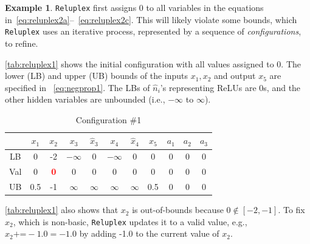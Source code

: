 \documentclass[oneside,11pt,dvipsnames]{book}
\numberwithin{equation}{section}
\theoremstyle{definition}
\newtheorem{example}{Example}[section]
\theoremstyle{remark}
\newcommand{\red}[1]{\textcolor{red}{#1}}
\newcommand{\reluplex}{\texttt{Reluplex}}
\newcommand{\sat}{\texttt{sat}}
\newcommand{\unsat}{\texttt{unsat}}
\begin{document}
\begin{example}
\reluplex{} first assigns 0 to all variables in the equations in~\autoref{eq:reluplex2a}--~\autoref{eq:reluplex2c}.  This will likely violate some bounds, which \reluplex{} uses an iterative process, represented by a sequence of \emph{configurations}, to refine.



\autoref{tab:reluplex1} shows the initial configuration with all values assigned to 0.
The lower (LB) and upper (UB) bounds of the inputs $x_1, x_2$ and output $x_5$ are specified in ~\autoref{eq:negprop1}. The LBs of $\hat{n}_i$'s representing ReLUs are 0s, and the other hidden variables are unbounded (i.e., $-\infty$ to $\infty$).

\begin{table}[h]
    \caption{Configuration \#1}\label{tab:reluplex1}
    \centering
    \small
\begin{tabular}{ccccccccccc}
     & $x_1$ & $x_2$ & $x_3$ & $\hat{x}_3$ & $x_4$ & $\hat{x}_4$ & $x_5$ &$a_1$&$a_2$&$a_3$ \\
    \midrule
    LB & 0 & -2 & $-\infty$&0&$-\infty$& 0 & 0 & 0 & 0 &0\\
    Val& 0 & \textbf{\red{0}} & 0 & 0 & 0 & 0 & 0 & 0 & 0 & 0\\
    UB & 0.5 & -1 &$\infty$&$\infty$&$\infty$&$\infty$&0.5& 0 & 0 & 0
\end{tabular}
\end{table}



\autoref{tab:reluplex1} also shows that $x_2$ is out-of-bounds because $0 \notin [-2,-1]$. To fix $x_2$, which is non-basic, \reluplex{} updates it to a valid value, e.g., $x_2 \texttt{+=} -1.0 = -1.0$ by adding -1.0 to the current value of $x_2$.


\end{example}
\end{document}
